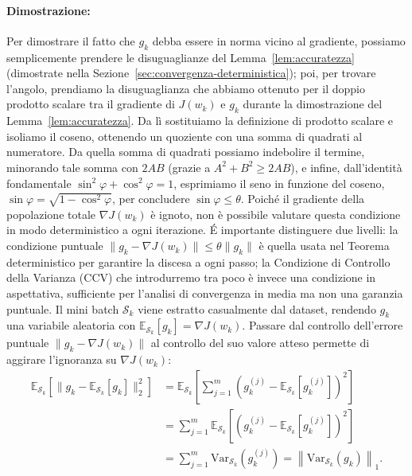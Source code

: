 \documentclass[italian, a4paper, twoside, binding=6mm]{sapthesis}
\newcommand{\E}{\mathbb{E}}
\begin{document}
\paragraph{Dimostrazione:}\label{sec:cono-dimostrazione}
Per dimostrare il fatto che $g_k$ debba essere in norma vicino al gradiente, possiamo semplicemente prendere le disuguaglianze del Lemma~\ref{lem:accuratezza} (dimostrate nella Sezione~\ref{sec:convergenza-deterministica}); poi, per trovare l'angolo, prendiamo la disuguaglianza che abbiamo ottenuto per il doppio prodotto scalare tra il gradiente di $J(w_k)$ e $g_k$ durante la dimostrazione del Lemma~\ref{lem:accuratezza}. Da lì sostituiamo la definizione di prodotto scalare e isoliamo il coseno, ottenendo un quoziente con una somma di quadrati al numeratore. Da quella somma di quadrati possiamo indebolire il termine, minorando tale somma con $2AB$ (grazie a $A^2+B^2 \ge 2AB$), e infine, dall'identità fondamentale $\sin^2\varphi+\cos^2\varphi=1$, esprimiamo il seno in funzione del coseno, $\sin\varphi=\sqrt{1-\cos^2\varphi}$, per concludere $\sin\varphi \le \theta$. \newline
Poich\'e il gradiente della popolazione totale $\nabla J(w_k)$ \`e ignoto, non \`e possibile valutare questa condizione in modo deterministico a ogni iterazione. \'E importante distinguere due livelli: la condizione puntuale $\|g_k - \nabla J(w_k)\| \le \theta\|g_k\|$ \`e quella usata nel Teorema deterministico per garantire la discesa a ogni passo; la Condizione di Controllo della Varianza (CCV) che introdurremo tra poco \`e invece una condizione in aspettativa, sufficiente per l'analisi di convergenza in media ma non una garanzia puntuale. Il mini batch $\mathcal{S}_k$ viene estratto casualmente dal dataset, rendendo $g_k$ una variabile aleatoria con $\E_{\mathcal{S}_k}[g_k] = \nabla J(w_k)$. Passare dal controllo dell'errore puntuale $\|g_k - \nabla J(w_k)\|$ al controllo del suo valore atteso permette di aggirare l'ignoranza su $\nabla J(w_k)$:
\begin{align*}
\mathbb{E}_{\mathcal{S}_k}\left[\|g_k - \mathbb{E}_{\mathcal{S}_k}[g_k]\|_2^2\right]
&= \mathbb{E}_{\mathcal{S}_k}\left[\sum_{j=1}^{m} \left(g_k^{(j)} - \mathbb{E}_{\mathcal{S}_k}[g_k^{(j)}]\right)^2\right] \\
&= \sum_{j=1}^{m} \mathbb{E}_{\mathcal{S}_k}\left[\left(g_k^{(j)} - \mathbb{E}_{\mathcal{S}_k}[g_k^{(j)}]\right)^2\right] \\
&= \sum_{j=1}^{m} \mathrm{Var}_{\mathcal{S}_k}\left(g_k^{(j)}\right)
= \left\|\mathrm{Var}_{\mathcal{S}_k}(g_k)\right\|_1.
\end{align*}
\end{document}
